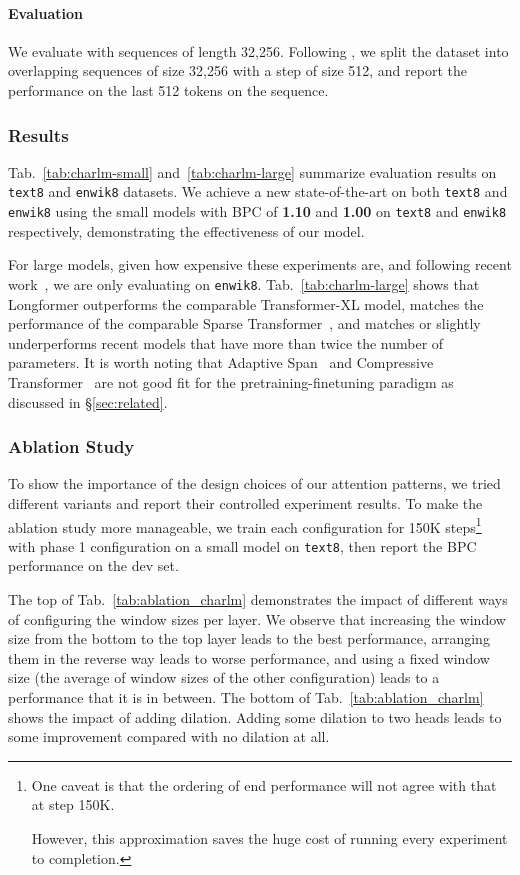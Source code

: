 \paragraph{Evaluation}
We evaluate with sequences of length 32,256.  Following \citet{transformerxl}, we split the dataset into overlapping sequences of size 32,256 with a step of size 512, and report the performance on the last 512 tokens on the sequence. 

\subsubsection{Results}
Tab.~\ref{tab:charlm-small} and~\ref{tab:charlm-large} summarize evaluation results on \texttt{text8} and \texttt{enwik8} datasets. We achieve a new state-of-the-art on both \texttt{text8} and \texttt{enwik8} using the small models with BPC of \textbf{1.10} and \textbf{1.00} on \texttt{text8} and \texttt{enwik8} respectively, demonstrating the effectiveness of our model.

For large models, given how expensive these experiments are, and following recent work~\cite{reformer,compressive}, we are only evaluating on \texttt{enwik8}. 
Tab.~\ref{tab:charlm-large} shows that Longformer outperforms the comparable Transformer-XL model, matches the performance of the comparable Sparse Transformer~\cite{sparseOpenai}, and matches or slightly underperforms recent models that have more than twice the number of parameters. It is worth noting that Adaptive Span~\cite{adaptivespan} and Compressive Transformer~\cite{compressive} are not good fit for the pretraining-finetuning paradigm as discussed in 
\S\ref{sec:related}.

\subsubsection{Ablation Study}

To show the importance of the design choices of our attention patterns, we tried different variants and report their controlled experiment results. To make the ablation study more manageable, we train each configuration for 150K steps\footnote{
One caveat is that the ordering of end performance will not agree with that at step 150K.

However, this approximation saves the huge cost of running every experiment to completion.} with phase 1 configuration on a small model on \texttt{text8}, then report the BPC performance on the dev set. 

The top of Tab.~\ref{tab:ablation_charlm} demonstrates the impact of different ways of configuring the window sizes per layer. We observe that increasing the window size from the bottom to the top layer leads to the best performance, arranging them in the reverse way leads to worse performance, and using a fixed window size (the average of window sizes of the other configuration) leads to a performance that it is in between. The bottom of Tab.~\ref{tab:ablation_charlm} shows the impact of adding dilation. Adding some dilation to two heads leads to some improvement compared with no dilation at all. 

